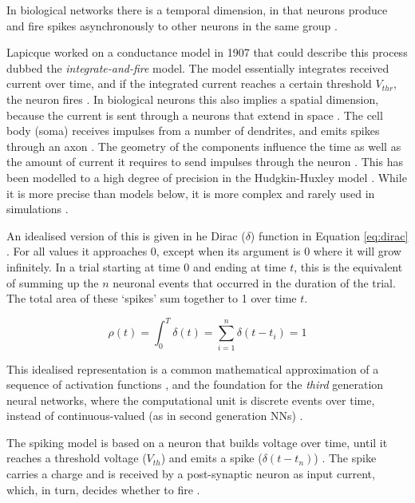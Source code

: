\documentclass[report.tex]{subfiles}
\begin{document}
In biological networks there is a temporal dimension, in that neurons
produce and fire spikes asynchronously to other neurons in the same
group \cite{Eliasmith2004}.

Lapicque worked on a conductance model in 1907 that could describe this
process dubbed the \textit{integrate-and-fire} 
model.
The model essentially integrates received current over time, and
if the integrated current reaches a certain threshold $V_{thr}$, the neuron
fires \cite{Dayan2001, Eliasmith2004}.
In biological neurons this also implies a spatial dimension, because the
current is sent through a neurons that extend in space \cite{Dayan2001}.
The cell body (soma) receives impulses from a number
of dendrites, and emits spikes through an 
axon \cite{Dayan2001}.
The geometry of the components influence the time as well as the amount of current
it requires to send impulses through the neuron \cite{Eliasmith2004}.
This has been modelled to a high degree of precision in the 
Hudgkin-Huxley model \cite{Dayan2001}.
While it is more precise than models below, it is
more complex \cite[p. 195]{Dayan2001} and rarely used in simulations
\cite{Albada2018, Dayan2001, Eliasmith2015}.

An idealised version of this is given in he Dirac ($\delta$) function 
in Equation \ref{eq:dirac} \cite[p. 404]{Dayan2001}.
For all values it approaches 0, except when its argument is
0 where it will grow infinitely.
In a trial starting at time $0$ and ending at time $t$, this
is the equivalent of summing up the $n$ neuronal events that occurred in 
the duration of the trial.
The total area of these `spikes' sum together to 1 over time $t$. 

\begin{equation} \label{eq:dirac}
  \rho(t) = \int_0^T \delta(t) = \sum_{i=1}^n \delta(t - t_i) = 1
\end{equation}

This idealised representation is a common mathematical approximation of
a sequence of activation functions \cite{Dayan2001, Eliasmith2004},
and the foundation for the \textit{third} generation
neural networks, where the computational unit is discrete events over time,
instead of continuous-valued (as in second generation \glspl{NN})
\cite{Maass1997}.

The spiking model is based on a neuron that builds voltage over time, until
it reaches a threshold voltage ($V_{th}$) and emits a spike
\mbox{($\delta(t-t_n)$)}
\cite{Dayan2001, Eliasmith2004}.
The spike carries a charge and is received by a post-synaptic neuron as
input current, which, in turn, decides whether to fire \cite{Dayan2001}.
\end{document}
